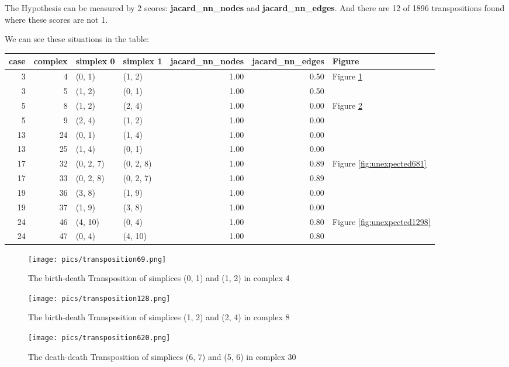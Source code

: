 \documentclass{article}
\begin{document}
\par The Hypothesis can be measured by 2 scores: \textbf{jacard\_nn\_nodes} and \textbf{jacard\_nn\_edges}.
And there are 12 of 1896 transpositions found where these scores are not 1.
\par We can see these situations in the table:
\begin{center}\begin{tabular}{rrllrrl}
\toprule
case & complex & simplex 0 & simplex 1 & jacard\_nn\_nodes & jacard\_nn\_edges & Figure \\
\midrule
3 & 4 & (0, 1) & (1, 2) & 1.00 & 0.50 & Figure \ref{fig:unexpected69} \\
3 & 5 & (1, 2) & (0, 1) & 1.00 & 0.50 &  \\
5 & 8 & (1, 2) & (2, 4) & 1.00 & 0.00 & Figure \ref{fig:unexpected128} \\
5 & 9 & (2, 4) & (1, 2) & 1.00 & 0.00 &  \\
13 & 24 & (0, 1) & (1, 4) & 1.00 & 0.00 &  \\
13 & 25 & (1, 4) & (0, 1) & 1.00 & 0.00 &  \\
17 & 32 & (0, 2, 7) & (0, 2, 8) & 1.00 & 0.89 & Figure \ref{fig:unexpected681} \\
17 & 33 & (0, 2, 8) & (0, 2, 7) & 1.00 & 0.89 &  \\
19 & 36 & (3, 8) & (1, 9) & 1.00 & 0.00 &  \\
19 & 37 & (1, 9) & (3, 8) & 1.00 & 0.00 &  \\
24 & 46 & (4, 10) & (0, 4) & 1.00 & 0.80 & Figure \ref{fig:unexpected1298} \\
24 & 47 & (0, 4) & (4, 10) & 1.00 & 0.80 &  \\
\bottomrule
\end{tabular}
\end{center}


\begin{figure}[ht]
\centering
\texttt{[image: pics/transposition69.png]}
\caption{The birth-death Transposition of simplices (0, 1) and (1, 2) in complex 4}
\label{fig:unexpected69}
\end{figure}

\begin{figure}[ht]
\centering
\texttt{[image: pics/transposition128.png]}
\caption{The birth-death Transposition of simplices (1, 2) and (2, 4) in complex 8}
\label{fig:unexpected128}
\end{figure}

\begin{figure}[ht]
\centering
\texttt{[image: pics/transposition620.png]}
\caption{The death-death Transposition of simplices (6, 7) and (5, 6) in complex 30}
\label{fig:unexpected620}
\end{figure}
\end{document}
